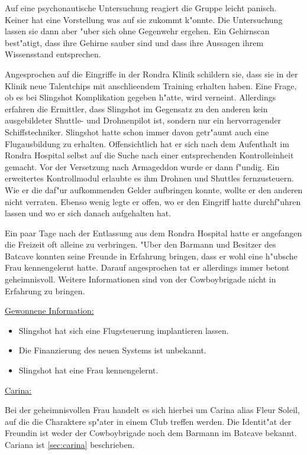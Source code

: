 Auf eine psychonautische Untersuchung reagiert die Gruppe leicht panisch. Keiner hat eine Vorstellung was auf sie zukommt k"onnte. Die Untersuchung lassen sie dann aber "uber sich ohne Gegenwehr ergehen. Ein Gehirnscan best"atigt, dass ihre Gehirne sauber sind und dass ihre Aussagen ihrem Wissensstand entsprechen. 

Angesprochen auf die Eingriffe in der Rondra Klinik schildern sie, dass sie in der Klinik neue Talentchips mit anschlie\3endem Training erhalten haben. Eine Frage, ob es bei Slingshot Komplikation gegeben h"atte, wird verneint. Allerdings erfahren die Ermittler, dass Slingshot im Gegensatz zu den anderen kein ausgebildeter Shuttle- und Drohnenpilot ist, sondern nur ein hervorragender Schiffstechniker. Slingshot hatte schon immer davon getr"aumt auch eine Flugausbildung zu erhalten. Offensichtlich hat er sich nach dem Aufenthalt im Rondra Hospital selbst auf die Suche nach einer entsprechenden Kontrolleinheit gemacht. Vor der Versetzung nach Armageddon wurde er dann f"undig. 
Ein erweitertes Kontrollmodul erlaubte es ihm Drohnen und Shuttles fernzusteuern. Wie er die daf"ur aufkommenden Gelder aufbringen konnte, wollte er den anderen nicht verraten. Ebenso wenig legte er offen, wo er den Eingriff hatte durchf"uhren lassen und wo er sich danach aufgehalten hat. 

Ein paar Tage nach der Entlassung aus dem Rondra Hospital hatte er angefangen die Freizeit oft alleine zu verbringen. "Uber den Barmann und Besitzer des Batcave konnten seine Freunde in Erfahrung bringen, dass er wohl eine h"ubsche Frau kennengelernt hatte. Darauf angesprochen tat er allerdings immer betont geheimnisvoll. Weitere Informationen sind von der Cowboybrigade nicht in Erfahrung zu bringen.

\begin{remarks}
	\underline{Gewonnene Information:}

	\begin{itemize}
		\item Slingshot hat sich eine Flugsteuerung implantieren lassen.
		\item Die Finanzierung des neuen Systems ist unbekannt.
		\item Slingshot hat eine Frau kennengelernt.
	\end{itemize}

	\underline{Carina:}
	
	Bei der geheimnisvollen Frau handelt es sich hierbei um Carina alias Fleur Soleil, auf die die Charaktere sp"ater in einem Club treffen werden. Die Identit"at der Freundin ist weder der Cowboybrigade noch dem Barmann im Batcave bekannt. Cariana ist \cref{sec:carina} beschrieben.
\end{remarks}

